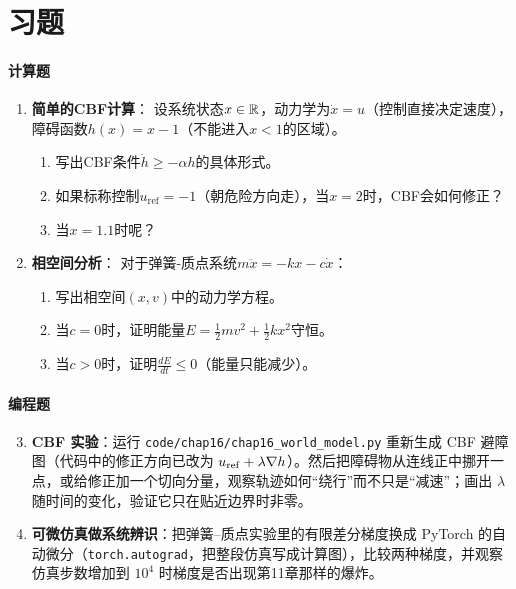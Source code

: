 \section{习题}

\paragraph{计算题}
\begin{enumerate}
    \item \textbf{简单的CBF计算}：
    设系统状态$x \in \mathbb{R}$，动力学为$\dot{x} = u$（控制直接决定速度），障碍函数$h(x) = x - 1$（不能进入$x < 1$的区域）。
    \begin{enumerate}
        \item 写出CBF条件$\dot{h} \geq -\alpha h$的具体形式。
        \item 如果标称控制$u_{\text{ref}} = -1$（朝危险方向走），当$x = 2$时，CBF会如何修正？
        \item 当$x = 1.1$时呢？
    \end{enumerate}
    
    \item \textbf{相空间分析}：
    对于弹簧-质点系统$m\ddot{x} = -kx - c\dot{x}$：
    \begin{enumerate}
        \item 写出相空间$(x, v)$中的动力学方程。
        \item 当$c = 0$时，证明能量$E = \frac{1}{2}mv^2 + \frac{1}{2}kx^2$守恒。
        \item 当$c > 0$时，证明$\frac{dE}{dt} \leq 0$（能量只能减少）。
    \end{enumerate}
    
\end{enumerate}

\paragraph{编程题}
\begin{enumerate}
    \setcounter{enumi}{2}
    \item \textbf{CBF 实验}：运行 \texttt{code/chap16/chap16\_world\_model.py} 重新生成 CBF 避障图（代码中的修正方向已改为 $u_{\rm ref} + \lambda \nabla h$）。然后把障碍物从连线正中挪开一点，或给修正加一个切向分量，观察轨迹如何“绕行”而不只是“减速”；画出 $\lambda$ 随时间的变化，验证它只在贴近边界时非零。
    
    \item \textbf{可微仿真做系统辨识}：把弹簧--质点实验里的有限差分梯度换成 PyTorch 的自动微分（\texttt{torch.autograd}，把整段仿真写成计算图），比较两种梯度，并观察仿真步数增加到 $10^4$ 时梯度是否出现第11章那样的爆炸。
\end{enumerate}


